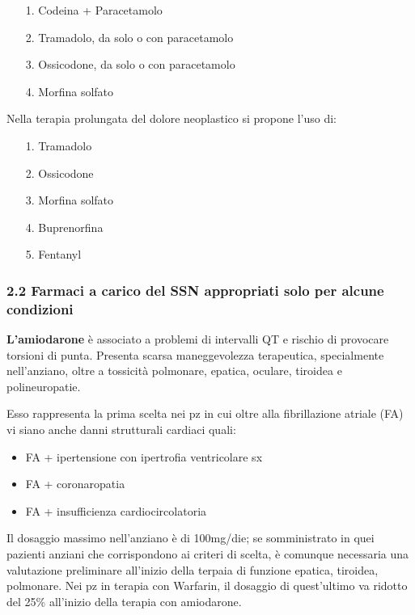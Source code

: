 \begin{itemize}
\item[1.]
  Codeina + Paracetamolo
\item[2.]
  Tramadolo, da solo o con paracetamolo
\item[3.]
  Ossicodone, da solo o con paracetamolo
\item[4.]
  Morfina solfato
\end{itemize}

  Nella terapia prolungata del dolore neoplastico si propone l'uso di:

\begin{itemize}
\item[1.]
  Tramadolo
\item[2.]
  Ossicodone
\item[3.]
  Morfina solfato
\item[4.]
  Buprenorfina
\item[5.]
  Fentanyl
\end{itemize}

  \subsubsection{2.2 Farmaci a carico del SSN appropriati solo per alcune condizioni}

  \textbf{L'amiodarone} è associato a problemi di intervalli QT e
  rischio di provocare torsioni di punta. Presenta scarsa maneggevolezza
  terapeutica, specialmente nell'anziano, oltre a tossicità polmonare,
  epatica, oculare, tiroidea e polineuropatie.

  Esso rappresenta la prima scelta nei pz in cui oltre alla
  fibrillazione atriale (FA) vi siano anche danni strutturali cardiaci
  quali:

\begin{itemize}
\item
  FA + ipertensione con ipertrofia ventricolare sx
\item
  FA + coronaropatia
\item
  FA + insufficienza cardiocircolatoria
\end{itemize}

  Il dosaggio massimo nell'anziano è di 100mg/die; se somministrato in
  quei pazienti anziani che corrispondono ai criteri di scelta, è
  comunque necessaria una valutazione preliminare all'inizio della
  terpaia di funzione epatica, tiroidea, polmonare. Nei pz in terapia
  con Warfarin, il dosaggio di quest'ultimo va ridotto del 25\%
  all'inizio della terapia con amiodarone.

